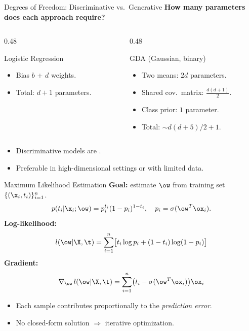 \begin{frame}{Degrees of Freedom: Discriminative vs.\ Generative}
  \textbf{How many parameters does each approach require?}
  \begin{columns}[T]
    \begin{column}{0.48\textwidth}
      \begin{block}{Logistic Regression}
        \begin{itemize}
          \item Bias $b$ + $d$ weights.
          \item Total: $d+1$ parameters.
        \end{itemize}
      \end{block}
    \end{column}
    \begin{column}{0.48\textwidth}
      \begin{block}{GDA (Gaussian, binary)}
        \begin{itemize}
          \item Two means: $2d$ parameters.
          \item Shared cov.\ matrix: $\frac{d(d+1)}{2}$.
          \item Class prior: $1$ parameter.
          \item Total: $\sim d(d+5)/2 + 1$.
        \end{itemize}
      \end{block}
    \end{column}
  \end{columns}
  \vspace{0.3cm}
  \begin{itemize}
    \item Discriminative models are .
    \item Preferable in high-dimensional settings or with limited data.
  \end{itemize}
\end{frame}

\begin{frame}{Maximum Likelihood Estimation}
  \textbf{Goal:} estimate $\ow$ from training set $\{(\x_i, t_i)\}_{i=1}^n$.
  \[
    p(t_i|\x_i;\ow) = p_i^{t_i}(1-p_i)^{1-t_i}, \quad p_i = \sigma(\ow^T\ox_i).
  \]
  \textbf{Log-likelihood:}
  \[
    l(\ow|\X,\t) = \sum_{i=1}^n \bigl[t_i\log p_i + (1-t_i)\log(1-p_i)\bigr]
  \]
  \textbf{Gradient:}
  \[
    \nabla_{\ow}\,l(\ow|\X,\t) = \sum_{i=1}^n\bigl(t_i - \sigma(\ow^T\ox_i)\bigr)\ox_i
  \]
  \begin{itemize}
    \item Each sample contributes proportionally to the \emph{prediction error}.
    \item No closed-form solution $\Rightarrow$ iterative optimization.
  \end{itemize}
\end{frame}

